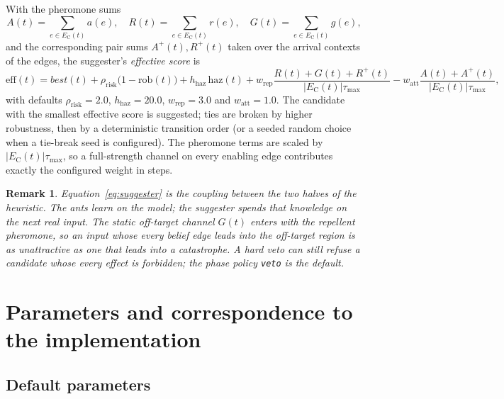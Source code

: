 \documentclass[11pt,a4paper]{article}
\newtheorem{remark}[definition]{Remark}
\newcommand{\Tau}{\tau_{\max}}
\begin{document}
With the pheromone sums
\[
  A(t)=\sum_{e\in E_{\mathrm{C}}(t)}a(e),\quad
  R(t)=\sum_{e\in E_{\mathrm{C}}(t)}r(e),\quad
  G(t)=\sum_{e\in E_{\mathrm{C}}(t)}g(e),
\]
and the corresponding pair sums $A^{+}(t),R^{+}(t)$ taken over the arrival
contexts of the edges, the suggester's \emph{effective score} is
\[
  \mathrm{eff}(t)=
  \mathit{best}(t)
  + \rho_{\mathrm{risk}}\bigl(1-\mathrm{rob}(t)\bigr)
  + h_{\mathrm{haz}}\,\mathrm{haz}(t)
  + w_{\mathrm{rep}}\frac{R(t)+G(t)+R^{+}(t)}{|E_{\mathrm{C}}(t)|\Tau}
  - w_{\mathrm{att}}\frac{A(t)+A^{+}(t)}{|E_{\mathrm{C}}(t)|\Tau},
  \label{eq:suggester}
\]
with defaults $\rho_{\mathrm{risk}}=2.0$, $h_{\mathrm{haz}}=20.0$,
$w_{\mathrm{rep}}=3.0$ and $w_{\mathrm{att}}=1.0$.  The candidate with the
smallest effective score is suggested; ties are broken by higher robustness,
then by a deterministic transition order (or a seeded random choice when a
tie-break seed is configured).  The pheromone terms are scaled by
$|E_{\mathrm{C}}(t)|\Tau$, so a full-strength channel on every enabling edge
contributes exactly the configured weight in steps.

\begin{remark}
Equation~\eqref{eq:suggester} is the coupling between the two halves of the
heuristic.  The ants learn on the model; the suggester spends that knowledge
on the next real input.  The static off-target channel $G(t)$ enters with the
repellent pheromone, so an input whose every belief edge leads into the
off-target region is as unattractive as one that leads into a catastrophe.  A
hard veto can still refuse a candidate whose every effect is forbidden; the
phase policy \texttt{veto} is the default.
\end{remark}

\section{Parameters and correspondence to the implementation}\label{sec:implementation}

\subsection{Default parameters}
\end{document}
